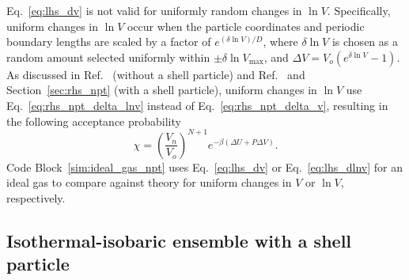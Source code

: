 \documentclass[
  9pt,
  bestpractices,
]{livecoms}
\begin{document}
Eq.~\ref{eq:lhs_dv} is not valid for uniformly random changes in $\ln V$.
Specifically, uniform changes in $\ln V$ occur when the particle coordinates and periodic boundary lengths are scaled by a factor of $e^{(\delta\ln V)/D}$, where $\delta\ln V$ is chosen as a random amount selected uniformly within $\pm\delta\ln V_{\mathrm{max}}$, and $\Delta V = V_o(e^{\delta\ln V}-1)$.
As discussed in Ref.~\cite{frenkel_understanding_2002} (without a shell particle) and Ref.~\cite{corti_monte_2002} and Section~\ref{sec:rhs_npt} (with a shell particle), uniform changes in $\ln V$ use Eq.~\ref{eq:rhs_npt_delta_lnv} instead of Eq.~\ref{eq:rhs_npt_delta_v}, resulting in the following acceptance probability
\begin{equation}
\chi=\left(\frac{V_n}{V_o}\right)^{N+1}e^{-\beta(\Delta U + P\Delta V)}.
\label{eq:lhs_dlnv}
\end{equation}
Code Block~\ref{sim:ideal_gas_npt} uses Eq.~\ref{eq:lhs_dv} or Eq.~\ref{eq:lhs_dlnv} for an ideal gas to compare against theory for uniform changes in $V$ or $\ln V$, respectively.

\begin{figure}

\end{figure}

\subsection{\label{sec:rhs_npt_no_shell}Isothermal-isobaric ensemble with a shell particle}
\end{document}
